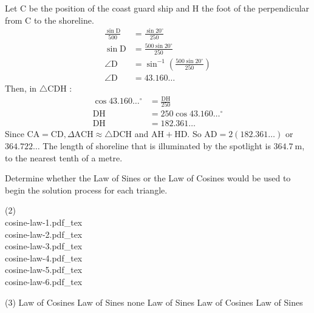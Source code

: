 \documentclass[12pt,fleqn]{book}
\newcommand{\incfig}[2][1]{%
    \def\svgwidth{#1\columnwidth}
    {#2.pdf_tex}
}
\newcommand{\prb}[1]{\begin{Exercise}\parbox[t]{\textwidth-5em}{#1}\end{Exercise}}
\newcommand{\sol}[1]{\begin{Answer}\parbox[t]{\textwidth-5em}{#1}\end{Answer}}
\begin{document}
\sol{
	Let $\mathrm{C}$ be the position of the coast guard ship and $\mathrm{H}$ the foot of the perpendicular from $\mathrm{C}$ to the shoreline.
	\begin{align*}
		\frac{\sin \mathrm{D}}{500} & =\frac{\sin 20^{\circ}}{250}                            \\
		\sin \mathrm{D}             & =\frac{500 \sin 20^{\circ}}{250}                        \\
		\angle \mathrm{D}           & =\sin ^{-1}\left(\frac{500 \sin 20^{\circ}}{250}\right) \\
		\angle \mathrm{D}           & =43.160 \ldots
	\end{align*}
	Then, in $\triangle \mathrm{CDH}$ :
	\begin{align*}
		\cos 43.160 \ldots{ }^{\circ} & =\frac{\mathrm{DH}}{250}           \\
		\mathrm{DH}                   & =250 \cos 43.160 \ldots{ }^{\circ} \\
		\mathrm{DH}                   & =182.361 \ldots
	\end{align*}
	Since $\mathrm{CA}=\mathrm{CD}, \Delta \mathrm{ACH} \approx \triangle \mathrm{DCH}$ and $\mathrm{AH}+\mathrm{HD}$.
	So $\mathrm{AD}=2(182.361 \ldots)$ or $364.722 \ldots$
	The length of shoreline that is illuminated by the spotlight is $364.7 \mathrm{~m}$, to the nearest tenth of a metre.
}
\clearpage
\prb{
	Determine whether the Law of Sines or the Law of Cosines would be used to begin the solution process for each triangle.
	\begin{tasks}(2)
		\task \\ \incfig[0.8]{cosine-law-1} \vspace{8em}
		\task \\ \incfig[0.8]{cosine-law-2} \vspace{8em}
		\task \\ \incfig[0.8]{cosine-law-3} \vspace{8em}
		\task \\ \incfig[0.8]{cosine-law-4} \vspace{8em}
		\task \\ \incfig[0.8]{cosine-law-5} \vspace{8em}
		\task \\ \incfig[0.8]{cosine-law-6} \vspace{8em}
	\end{tasks}
}
\sol{
	\begin{tasks}(3)
		\task Law of Cosines
		\task Law of Sines
		\task none
		\task Law of Sines
		\task Law of Cosines 
		\task Law of Sines
	\end{tasks}
}
\end{document}
